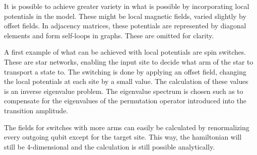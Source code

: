 
\begin{center}
\end{center}

\noindent It is possible to achieve greater variety in what is possible by incorporating local potentials in the model. These might be local magnetic fields, varied slightly by offset fields. In adjacency matrices, these potentials are represented by diagonal elements and form self-loops in graphs. These are omitted for clarity.\par
A first example of what can be achieved with local potentials are spin switches. These are star networks, enabling the input site to decide what arm of the star to transport a state to. The switching is done by applying an offset field, changing the local potentials at each site by a small value. The calculation of these values is an inverse eigenvalue problem. The eigenvalue spectrum is chosen such as to compensate for the eigenvalues of the permutation operator introduced into the transition amplitude.\par
The fields for switches with more arms can easily be calculated by renormalizing every outgoing qubit except for the target site. This way, the hamiltonian will still be 4-dimensional and the calculation is still possible analytically.


